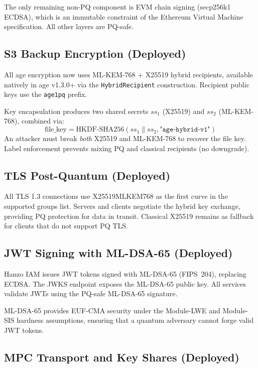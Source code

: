 \noindent The only remaining non-PQ component is EVM chain signing
(secp256k1 ECDSA), which is an immutable constraint of the Ethereum
Virtual Machine specification. All other layers are PQ-safe.

\subsection{S3 Backup Encryption (Deployed)}

All age encryption now uses ML-KEM-768 + X25519 hybrid recipients,
available natively in age v1.3.0+ via the \texttt{HybridRecipient}
construction. Recipient public keys use the \texttt{age1pq} prefix.

Key encapsulation produces two shared secrets $ss_1$ (X25519) and
$ss_2$ (ML-KEM-768), combined via:
\begin{equation}
  \text{file\_key} = \text{HKDF-SHA256}(ss_1 \| ss_2, \texttt{"age-hybrid-v1"})
\end{equation}
An attacker must break \emph{both} X25519 and ML-KEM-768 to recover
the file key. Label enforcement prevents mixing PQ and classical
recipients (no downgrade).

\subsection{TLS Post-Quantum (Deployed)}

All TLS 1.3 connections use X25519MLKEM768 as the first curve in the
supported groups list. Servers and clients negotiate the hybrid
key exchange, providing PQ protection for data in transit. Classical
X25519 remains as fallback for clients that do not support PQ TLS.

\subsection{JWT Signing with ML-DSA-65 (Deployed)}

Hanzo IAM issues JWT tokens signed with ML-DSA-65 (FIPS~204),
replacing ECDSA. The JWKS endpoint exposes the ML-DSA-65 public key.
All services validate JWTs using the PQ-safe ML-DSA-65 signature.

ML-DSA-65 provides EUF-CMA security under the Module-LWE and
Module-SIS hardness assumptions, ensuring that a quantum adversary
cannot forge valid JWT tokens.

\subsection{MPC Transport and Key Shares (Deployed)}

